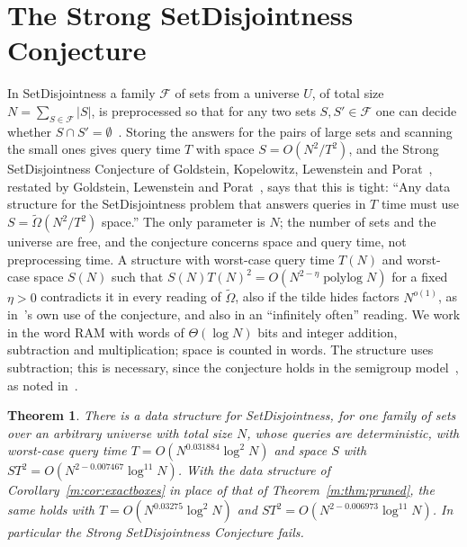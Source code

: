 \documentclass[11pt]{article}
\newtheorem{theorem}{Theorem}[section]
\theoremstyle{definition}
\theoremstyle{remark}
\DeclareMathOperator{\polylog}{polylog}
\newcommand{\SetDisjEta}{0.006973}%
\newcommand{\SetDisjEtaPruned}{0.007467}%
\newcommand{\SetDisjTauPruned}{0.031884}%
\newcommand{\SetDisjTau}{0.03275}%
\begin{document}
\section{The Strong SetDisjointness Conjecture}\label{m:sec:setdisj}

In SetDisjointness a family $\mathcal F$ of sets from a universe $U$, of total size $N=\sum_{S\in\mathcal F}|S|$, is preprocessed so that for any two sets $S,S'\in\mathcal F$ one can decide whether $S\cap S'=\emptyset$~\cite[Problem~1]{GKLP17}. Storing the answers for the pairs of large sets and scanning the small ones gives query time $T$ with space $S=O(N^2/T^2)$, and the Strong SetDisjointness Conjecture of Goldstein, Kopelowitz, Lewenstein and Porat~\cite[Conjecture~3]{GKLP17}, restated by Goldstein, Lewenstein and Porat~\cite[Conjecture~2]{GLP19}, says that this is tight: ``Any data structure for the SetDisjointness problem that answers queries in $T$ time must use $S=\tilde\Omega(N^2/T^2)$ space.'' The only parameter is $N$; the number of sets and the universe are free, and the conjecture concerns space and query time, not preprocessing time. A structure with worst-case query time $T(N)$ and worst-case space $S(N)$ such that $S(N)T(N)^2=O(N^{2-\eta}\polylog N)$ for a fixed $\eta>0$ contradicts it in every reading of $\tilde\Omega$, also if the tilde hides factors $N^{o(1)}$, as in~\cite{GKLP17}'s own use of the conjecture, and also in an ``infinitely often'' reading. We work in the word RAM with words of $\Theta(\log N)$ bits and integer addition, subtraction and multiplication; space is counted in words. The structure uses subtraction; this is necessary, since the conjecture holds in the semigroup model~\cite{DMRU95}, as noted in~\cite{GLP19}.

\begin{theorem}\label{m:thm:setdisj}
There is a data structure for SetDisjointness, for one family of sets over an arbitrary universe with total size $N$, whose queries are deterministic, with worst-case query time $T=O(N^{\SetDisjTauPruned}\log^2N)$ and space $S$ with $ST^2=O(N^{2-\SetDisjEtaPruned}\log^{11}N)$. With the data structure of Corollary~\ref{m:cor:exactboxes} in place of that of Theorem~\ref{m:thm:pruned}, the same holds with $T=O(N^{\SetDisjTau}\log^2N)$ and $ST^2=O(N^{2-\SetDisjEta}\log^{11}N)$. In particular the Strong SetDisjointness Conjecture fails.
\end{theorem}
\end{document}
